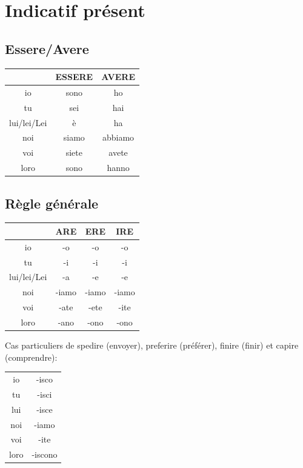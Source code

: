 \documentclass[12pt, openany]{report}
\begin{document}
\section{Indicatif présent}
\subsection{Essere/Avere}
\begin{center}
    \begin{tabular}{c|c|c}
        & ESSERE & AVERE \\ \hline
        io & sono & ho\\
        tu & sei & hai\\
        lui/lei/Lei & è & ha\\ 
        noi & siamo & abbiamo \\
        voi & siete & avete \\
        loro & sono & hanno\\
    \end{tabular}
\end{center}
\subsection{Règle générale}
\begin{minipage}{.49\textwidth}
    \vspace{.75cm}
    \begin{center}
        \begin{tabular}{c||c|c|c}
            & ARE & ERE & IRE\\
            \hline
            io & -o & -o & -o\\
            tu & -i & -i & -i\\
            lui/lei/Lei & -a & -e & -e\\
            noi & -iamo & -iamo & -iamo\\
            voi & -ate & -ete & -ite\\
            loro & -ano & -ono & -ono\\
        \end{tabular}
    \end{center}
\end{minipage}
\begin{minipage}{.45\textwidth}
    Cas particuliers de spedire (envoyer), preferire (préférer), finire (finir) et capire (comprendre):
    \begin{center}
        \begin{tabular}{c||c}
            io & -isco \\
            tu & -isci \\
            lui & -isce \\
            noi & -iamo \\
            voi & -ite \\
            loro & -iscono \\
        \end{tabular}
    \end{center}
\end{minipage}
\end{document}
